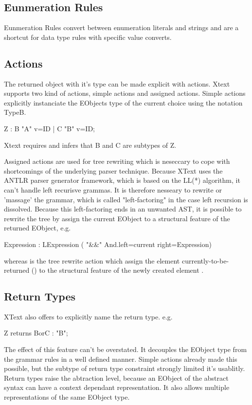 \subsection{Eunmeration Rules}
Eunmeration Rules convert between enumeration literals and strings and are a shortcut for data type rules with specific value converts.

\subsection{Actions}
The returned object with it's type can be made explicit with actions. Xtext supports two kind of actions, simple actions and assigned actions. Simple actions explicitly instanciate the EObjects type of the current choice using the notation {TypeB}.
\begin{xtxt}
Z 	: 	{B} "A" v=ID
	| 	{C} "B" v=ID;
\end{xtxt}
Xtext requires and infers that B and C are subtypes of Z. 

Assigned actions are used for tree rewriting which is neseccary to cope with shortcomings of the underlying parser technique. Because XText uses the ANTLR parser generator framework, which is based on the LL(*) algorithm, it can't handle left recurisve grammas. It is therefore nesseary to rewrite or 'massage' the grammar, which is called "left-factoring" in the case left recursion is dissolved. Because this left-factoring ends in an unwanted AST, it is possible to rewrite the tree by assign the current EObject to a structural feature of the returned EObject, e.g. 
\begin{xtxt}
Expression 	: 	LExpression 
	 	( "&&" {And.left=current}  right=Expression)
\end{xtxt}
whereas  is the tree rewrite action which assign the element currently-to-be-returned () to the structural feature  of the newly created element .

\subsection{Return Types}
XText also offers to explicitly name the return type. e.g.
\begin{xtxt}
Z returns BorC	: "B";
\end{xtxt}
The effect of this feature can't be overstated.  It decouples the EObject type from the grammar rules in a well defined manner. Simple actions already made this possible, but the subtype of return type constraint strongly limited it's usablitly. Return types raise the abtraction level, because an EObject of the abstract syntax can have a context dependant representation. It also allows multiple representations of the same EObject type.

